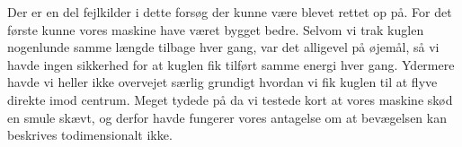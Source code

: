 \documentclass[12pt,a4paper]{article}
\theoremstyle{break}
\theoremstyle{nonumberplain}
\begin{document}
Der er en del fejlkilder i dette forsøg der kunne være blevet rettet op på.
For det første kunne vores maskine have været bygget bedre. 
Selvom vi trak kuglen nogenlunde samme længde tilbage hver gang, var det alligevel på øjemål, så vi havde ingen sikkerhed for at kuglen fik tilført samme energi hver gang.
Ydermere havde vi heller ikke overvejet særlig grundigt hvordan vi fik kuglen til at flyve direkte imod centrum. 
Meget tydede på da vi testede kort at vores maskine skød en smule skævt, og derfor havde fungerer vores antagelse om at bevægelsen kan beskrives todimensionalt ikke. 
\end{document}
